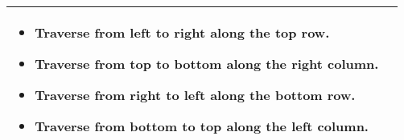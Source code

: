 \begin{summary}
\begin{center}
\begin{tabular}{ll}
{\begin{itemize}
\begin{itemize}
                        \item Traverse from left to right along the top row.
                        \item Traverse from top to bottom along the right column.
                        \item Traverse from right to left along the bottom row.
                        \item Traverse from bottom to top along the left column.
                    \end{itemize}
                \end{itemize}
            } \\
            \bottomrule
        \end{tabular}
    \end{center}
\end{summary}

